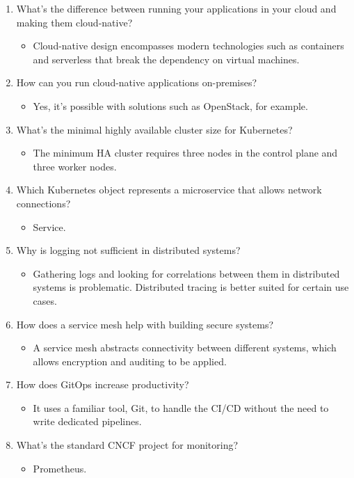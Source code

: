 \begin{enumerate}
\item
What's the difference between running your applications in your cloud and making them cloud-native?
\begin{itemize}
\item 
Cloud-native design encompasses modern technologies such as containers and serverless that break the dependency on virtual machines.
\end{itemize}

\item
How can you run cloud-native applications on-premises?
\begin{itemize}
\item 
Yes, it's possible with solutions such as OpenStack, for example.
\end{itemize}

\item
What's the minimal highly available cluster size for Kubernetes?
\begin{itemize}
\item 
The minimum HA cluster requires three nodes in the control plane and three worker nodes.
\end{itemize}

\item
Which Kubernetes object represents a microservice that allows network connections?
\begin{itemize}
\item 
Service.
\end{itemize}

\item
Why is logging not sufficient in distributed systems?
\begin{itemize}
\item 
Gathering logs and looking for correlations between them in distributed systems is problematic. Distributed tracing is better suited for certain use cases.
\end{itemize}

\item
How does a service mesh help with building secure systems?
\begin{itemize}
\item 
A service mesh abstracts connectivity between different systems, which allows encryption and auditing to be applied.
\end{itemize}

\item
How does GitOps increase productivity?
\begin{itemize}
\item 
It uses a familiar tool, Git, to handle the CI/CD without the need to write dedicated pipelines.
\end{itemize}

\item
What's the standard CNCF project for monitoring?
\begin{itemize}
\item 
Prometheus.
\end{itemize}
\end{enumerate}